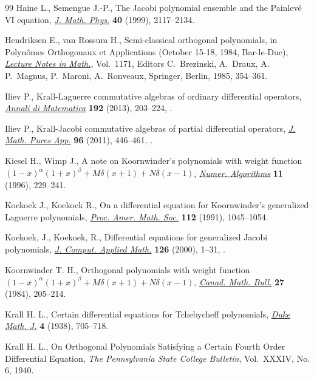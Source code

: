 \documentclass[10pt, reqno]{amsart}
\numberwithin{equation}{section}
\numberwithin{equation}{section}
\begin{document}
\begin{thebibliography}{99}
Haine L., Semengue J.-P., 
The Jacobi polynomial ensemble and the Painlevé VI equation, 
\href{https://doi.org//10.1063/1.532855}{\textit{J. Math. Phys.}} \textbf{40} (1999), 2117--2134.

Hendriksen E., van Rossum H., 
Semi-classical orthogonal polynomials, in Polynômes Orthogonaux et Applications (October 15-18, 1984, Bar-le-Duc), 
\href{https://doi.org//10.1007/BFb0076564}{\textit{Lecture Notes in Math.}}, Vol.~1171, 
Editors C.~Brezinski, A.~Draux, A. P.~Magnus, P.~Maroni, A.~Ronveaux, Springer, Berlin, 1985, 354--361.

Iliev P., 
Krall-Laguerre commutative algebras of ordinary differential operators, 
\href{https://doi.org//10.1007/s10231-011-0219-9}{\textit{Annali di Matematica}} \textbf{192} (2013), 203--224, .

Iliev P., 
Krall-Jacobi commutative algebras of partial differential operators, 
\href{https://doi.org/10.1016/j.matpur.2011.03.001}{\textit{J. Math. Pures App.}} \textbf{96} (2011), 446--461, .

Kiesel H., Wimp J.,
A note on Koornwinder's polynomials with weight function $(1-x)^{\alpha}(1+x)^{\beta}+M\delta(x+1)+N\delta(x-1)$,
\href{https://doi.org/10.1007/BF02142499}{\textit{Numer. Algorithms}} \textbf{11} (1996), 229--241.

Koekoek J., Koekoek R., 
On a differential equation for Koornwinder's generalized Laguerre polynomials, 
\href{https://doi.org//10.1090/S0002-9939-1991-1047003-9}{\textit{Proc. Amer. Math. Soc.}} \textbf{112} (1991), 1045--1054.

Koekoek, J., Koekoek, R., 
Differential equations for generalized Jacobi polynomials, 
\href{https://doi.org//10.1016/S0377-0427(99)00338-6}{\textit{J. Comput. Applied Math.}} \textbf{126} (2000), 1--31, .

Koornwinder T. H., 
Orthogonal polynomials with weight function $(1-x)^{\alpha}(1+x)^{\beta} +M\delta(x+1)+N\delta(x-1)$, 
\href{https://doi.org//10.4153/CMB-1984-030-7}{\textit{Canad. Math. Bull.}} \textbf{27} (1984), 205--214.

Krall H. L., 
Certain differential equations for Tchebycheff polynomials, 
\href{https://doi.org// 10.1215/S0012-7094-38-00462-4}{\textit{Duke Math. J.}} \textbf{4} (1938), 705--718.

Krall H. L., 
On Orthogonal Polynomials Satisfying a Certain Fourth Order Differential Equation, 
\textit{The Pennsylvania State College Bulletin}, Vol.~XXXIV, No. 6, 1940.


\end{thebibliography}
\end{document}
